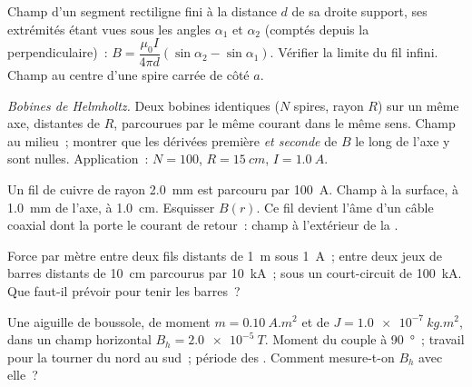 \begin{exercise}[$\star\star$]\label{exo:b1:magnetostatics:5}
Champ d'un segment rectiligne fini à la distance $d$ de sa droite support, ses
extrémités étant vues sous les angles $\alpha_1$ et $\alpha_2$ (comptés depuis
la perpendiculaire)~: $B = \dfrac{\mu_0I}{4\pi d}(\sin\alpha_2 - \sin\alpha_1)$. Vérifier
la limite du fil infini. Champ au centre d'une spire carrée de côté
$a$.
\end{exercise}

\begin{exercise}[$\star\star$]\label{exo:b1:magnetostatics:6}
\emph{Bobines de Helmholtz.} Deux bobines identiques ($N$ spires, rayon $R$)
sur un même axe, distantes de $R$, parcourues par le même courant dans le même
sens. Champ au milieu~; montrer que les dérivées première \emph{et seconde}
de $B$ le long de l'axe y sont nulles. Application~: $N = 100$,
$R = \qty{15}{cm}$, $I = \qty{1.0}{A}$.
\end{exercise}

\begin{exercise}[$\star\star$]\label{exo:b1:magnetostatics:7}
Un fil de cuivre de rayon \qty{2.0}{mm} est parcouru par \qty{100}{A}. Champ à
la surface, à \qty{1.0}{mm} de l'axe, à \qty{1.0}{cm}. Esquisser $B(r)$.
Ce fil devient l'âme d'un câble coaxial dont la  porte le courant de
retour~: champ à l'extérieur de la .
\end{exercise}

\begin{exercise}[$\star\star$]\label{exo:b1:magnetostatics:8}
Force par mètre entre deux fils distants de \qty{1}{m} sous \qty{1}{A}~; entre
deux jeux de barres distants de \qty{10}{cm} parcourus par \qty{10}{kA}~; sous
un court-circuit de \qty{100}{kA}. Que faut-il prévoir pour tenir les barres~?
\end{exercise}

\begin{exercise}[$\star\star$]\label{exo:b1:magnetostatics:9}
Une aiguille de boussole, de moment $m = \qty{0.10}{A.m^2}$ et de  $J = \qty{1.0e-7}{kg.m^2}$, dans un champ horizontal $B_h = \qty{2.0e-5}{T}$.
Moment du couple à \qty{90}{\degree}~; travail pour la tourner du nord au sud~;
période des . Comment mesure-t-on $B_h$ avec elle~?
\end{exercise}


